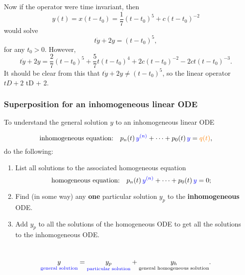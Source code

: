 Now if the operator were time invariant, then
\begin{equation*}
  \displaystyle  y\left(t\right)
  =x\left(t-t_{0}\right)=\frac{1}{7}\left(t-t_0\right)^{5}+c\left(t-t_0\right)^{-2}
\end{equation*}
would solve
\begin{equation*}
  \displaystyle  t\dot{y}+2y=\left(t-t_{0}\right)^5,
\end{equation*}
for any $t_{0}>0$. However,
\begin{equation*}
  \displaystyle t\dot{y}+2y
  =\frac{2}{7}\left(t-t_{0}\right)^5+\frac{5}{7}t\left(t-t_{0}\right)^4
  +2c\left(t-t_0\right)^{-2}-2ct\left(t-t_{0}\right)^{-3}.
\end{equation*}
It should be clear from this that $t\dot{y}+2y\neq \left(t-t_{0}\right)^5$,
so the linear operator $tD + 2$ tD + 2. 
\clearpage

\subsubsection{Superposition for an inhomogeneous linear ODE}
To understand the general solution $y$ to an inhomogeneous linear ODE

\begin{equation*}
  \text {inhomogeneous equation:}
  \quad p_ n(t) \,  {\color{blue}{y^{(n)}}}  + \cdots + p_0(t) \,
  {\color{blue}{y}}  = {\color{orange}{q(t)}} ,
\end{equation*}
do the following:
\begin{enumerate}
\item List all solutions to the associated homogeneous equation
  \begin{equation*}
    \text {homogeneous equation:}
    \quad p_ n(t) \,  {\color{blue}{y^{(n)}}}  +
    \cdots + p_0(t) \,  {\color{blue}{y}}  = 0;
  \end{equation*}
\item Find (in some way) any \textbf{one} particular solution $y_p$ to the
  \textbf{inhomogeneous} ODE.
\item Add $y_p$ to all the solutions of the homogeneous ODE to get all the solutions to the inhomogeneous ODE.
\end{enumerate}

\Summary \\
\begin{equation*}
  \underset {{\color{blue}{\text {general solution}}} }{y}
  = \underset {{\color{blue}{\text {particular solution}}} }{y_ p}
  + \underset {\text {general homogeneous solution}}{y_ h}.
\end{equation*}

